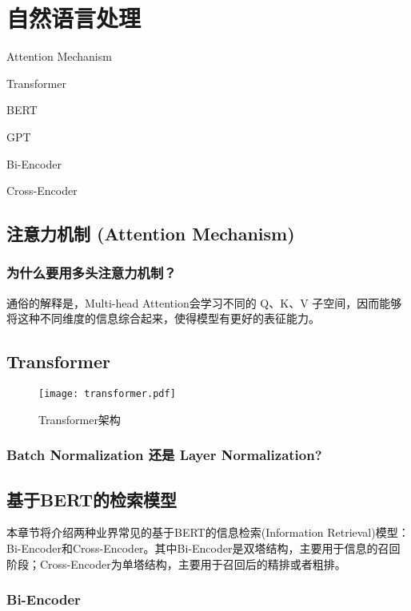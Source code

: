 \chapter{自然语言处理}
\begin{introduction}
  \item Attention Mechanism
  \item Transformer
  \item BERT
  \item GPT
  \item Bi-Encoder
  \item Cross-Encoder
\end{introduction}

\section{注意力机制 (Attention Mechanism)}


\subsection{为什么要用多头注意力机制？}

通俗的解释是，Multi-head Attention会学习不同的 Q、K、V 子空间，因而能够将这种不同维度的信息综合起来，使得模型有更好的表征能力。

\section{Transformer}

\begin{figure}[htbp]
  \centering
  \texttt{[image: transformer.pdf]}
  \caption{Transformer架构 \label{fig:transformer}}
\end{figure}


\subsection{Batch Normalization 还是 Layer Normalization?}

\section{基于BERT的检索模型}

本章节将介绍两种业界常见的基于BERT的信息检索(Information Retrieval)模型：Bi-Encoder和Cross-Encoder。其中Bi-Encoder是双塔结构，主要用于信息的召回阶段；Cross-Encoder为单塔结构，主要用于召回后的精排或者粗排。

\subsection{Bi-Encoder}

